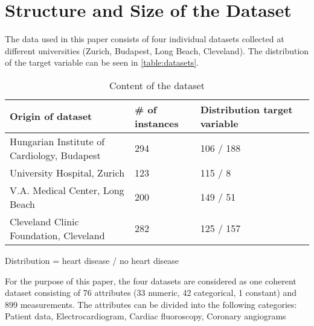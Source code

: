\section{Structure and Size of the Dataset} \label{sec:dataUnderstanding}


The data used in this paper consists of four individual datasets collected at different universities (Zurich, Budapest, Long Beach, Cleveland). The distribution of the target variable can be seen in \vref{table:datasets}.
\begin{table}[h]

    \begin{footnotesize}
        \begin{tabular}{|l|l|l|l|}
            \hline
            \textbf{Origin of dataset}              & \textbf{\# of instances} & \textbf{Distribution target variable} \\ \hline
            Hungarian Institute of Cardiology, Budapest & 294                      & 106 / 188                             \\ \hline
            University Hospital, Zurich                 & 123                      & 115 / 8                               \\ \hline
            V.A. Medical Center, Long Beach             & 200                      & 149 / 51                              \\ \hline
            Cleveland Clinic Foundation, Cleveland      & 282                      & 125 / 157                             \\ \hline
        \end{tabular}
    \end{footnotesize}
    \begin{center}
        \centering
        Distribution = heart disease / no heart disease
    \end{center}
    \caption{Content of the dataset}
    \label{table:datasets}
\end{table}



For the purpose of this paper, the four datasets are considered as one coherent dataset consisting of 76 attributes (33 numeric, 42 categorical, 1 constant) and 899 measurements.
The attributes can be divided into the following categories: Patient data, Electrocardiogram, Cardiac fluoroscopy, Coronary angiograms

